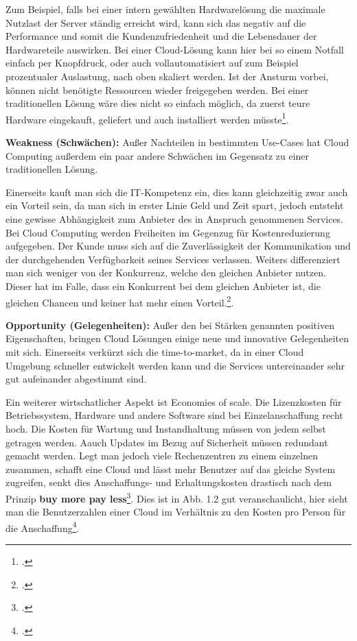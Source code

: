 Zum Beispiel, falls bei einer intern gewählten Hardwarelösung die maximale Nutzlast der Server ständig erreicht wird, kann sich das negativ auf die Performance und somit die Kundenzufriedenheit und die Lebensdauer der 
Hardwareteile auswirken. Bei einer Cloud-Lösung kann hier bei so einem Notfall einfach per Knopfdruck, oder auch vollautomatisiert auf zum Beispiel prozentualer Auslastung, nach oben skaliert werden. Ist der Ansturm vorbei, können nicht benötigte Ressourcen wieder freigegeben werden.
Bei einer traditionellen Lösung wäre dies nicht so einfach möglich, da zuerst teure Hardware eingekauft, geliefert und auch installiert werden müsste\footcite{Lehrunterlagen-HTL-cloud}.

\textbf{Weakness (Schwächen):} Außer Nachteilen in bestimmten Use-Cases hat Cloud Computing außerdem ein paar andere Schwächen im Gegensatz zu einer traditionellen Lösung.

Einerseits kauft man sich die IT-Kompetenz ein, dies kann gleichzeitig zwar auch ein Vorteil sein, da man sich in erster 
Linie Geld und Zeit spart, jedoch entsteht eine gewisse Abhängigkeit zum Anbieter des in Anspruch genommenen Services. Bei Cloud Computing werden Freiheiten im Gegenzug für Kostenreduzierung aufgegeben. Der Kunde muss sich auf die Zuverlässigkeit der
Kommunikation und der durchgehenden Verfügbarkeit seines Services verlassen.
Weiters differenziert man sich weniger von der Konkurrenz, welche den gleichen Anbieter nutzen.
Dieser hat im Falle, dass ein Konkurrent bei dem gleichen Anbieter ist, die gleichen Chancen und keiner hat mehr einen Vorteil.\footcite{Lehrunterlagen-HTL-cloud}.

\textbf{Opportunity (Gelegenheiten):} Außer den bei Stärken genannten positiven Eigenschaften, bringen Cloud Lösungen einige neue und innovative Gelegenheiten mit sich. Einerseits verkürzt sich die time-to-market, da in einer Cloud Umgebung schneller entwickelt werden kann und die Services
untereinander sehr gut aufeinander abgestimmt sind.

Ein weiterer wirtschatlicher Aspekt ist Economies of scale.
Die Lizenzkosten für Betriebssystem, Hardware und andere Software sind bei Einzelanschaffung recht hoch.
Die Kosten für Wartung und Instandhaltung müssen von jedem selbst getragen werden. Aauch Updates im Bezug auf Sicherheit müssen redundant gemacht werden. Legt man jedoch viele Rechenzentren zu einem einzelnen zusammen, schafft eine Cloud und lässt mehr Benutzer auf das gleiche System zugreifen, senkt
dies Anschaffungs- und Erhaltungskosten drastisch nach dem Prinzip \textbf{buy more pay less}\footcite{eos}. Dies ist in Abb. 1.2 gut veranschaulicht, hier sieht man die Benutzerzahlen einer Cloud im Verhältnis zu den Kosten pro Person für die Anschaffung\footcite{Lehrunterlagen-HTL-cloud}.

